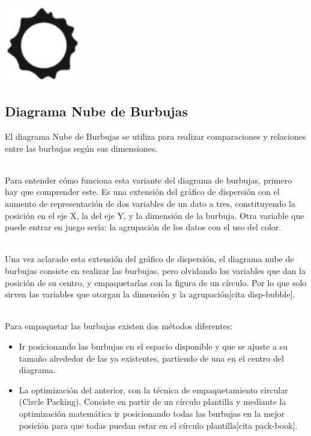 \documentclass{article}\usepackage[]{graphicx}\usepackage[]{color}
\begin{document}
~\\~\\~\\~\\
\vbox{
    \centering
    \includegraphics[width=0.25\textwidth]{imag/flow}
}
\clearpage
\subsection{Diagrama Nube de Burbujas}
El diagrama Nube de Burbujas se utiliza para realizar comparaciones y relaciones entre las burbujas seg\'un sus dimensiones.~\\~\par
Para entender c\'omo funciona esta variante del diagrama de burbujas, primero hay que comprender este.  Es una extensi\'on del gr\'afico de dispersi\'on con el aumento de representaci\'on de dos variables de un dato a tres, constituyendo la posici\'on en el eje X, la del eje Y, y la dimensi\'on de la burbuja.  Otra variable que puede entrar en juego ser\'ia: la agrupaci\'on de los datos con el uso del color.~\\~\par
Una vez aclarado esta extensi\'on del gr\'afico de dispersi\'on, el diagrama nube de burbujas consiste en realizar las burbujas, pero olvidando las variables que dan la posici\'on de su centro, y empaquetarlas con la figura de un c\'irculo. Por lo que solo sirven las variables que otorgan la dimensi\'on y la agrupaci\'on[cita disp-bubble].~\\~\par
Para empaquetar las burbujas existen dos m\'etodos diferentes:
\begin{itemize}
\item Ir posicionando las burbujas en el espacio disponible y que se ajuste a su tama\~no alrededor de las ya existentes, partiendo de una en el centro del diagrama.
\item La optimizaci\'on del anterior, con la t\'ecnica de empaquetamiento circular (Circle Packing). Consiste en partir de un c\'irculo plantilla y mediante la optimizaci\'on matem\'atica ir posicionando todas las burbujas en la mejor posici\'on para que todas puedan estar en el c\'irculo plantilla[cita pack-book].
\end{itemize}
\end{document}
